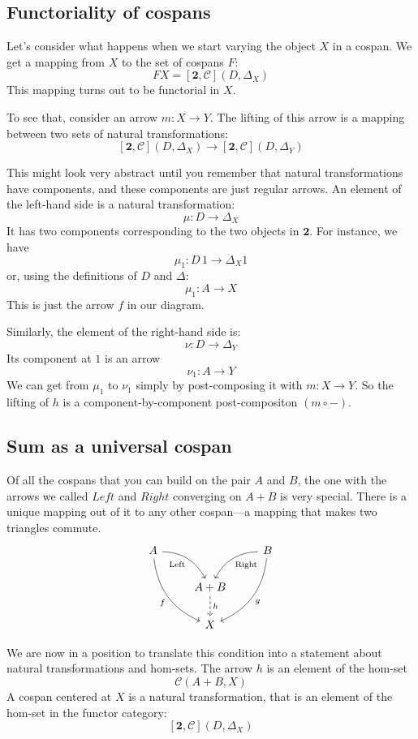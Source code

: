 \documentclass[DaoFP]{subfiles}
\begin{document}
\subsection{Functoriality of cospans}

Let's consider what happens when we start varying the object $X$ in a cospan. We get a mapping from $X$ to the set of cospans $F$:
\[ F X = [\mathbf{2}, \mathcal{C}](D, \Delta_X) \]
This mapping turns out to be functorial in $X$.

To see that, consider an arrow $m \colon X \to Y$. The lifting of this arrow is a mapping between two sets of natural transformations:
\[ [\mathbf{2}, \mathcal{C}](D, \Delta_X) \to [\mathbf{2}, \mathcal{C}](D, \Delta_{Y}) \] 
 
This might look very abstract until you remember that natural transformations have components, and these components are just regular arrows. An element of the left-hand side is a natural transformation:
\[ \mu \colon D \to \Delta_X \]
It has two components corresponding to the two objects in $\mathbf{2}$. For instance, we have
\[ \mu_1 \colon D \, 1 \to \Delta_X 1 \]
or, using the definitions of $D$ and $\Delta$:
\[ \mu_1 \colon A \to X \]
This is just the arrow $f$ in our diagram. 

Similarly, the element of the right-hand side is:
\[ \nu \colon D \to \Delta_{Y} \]
Its component at $1$ is an arrow
\[ \nu_1 \colon A \to Y \]
We can get from $\mu_1$ to $\nu_1$ simply by post-composing it with $m \colon X \to Y$. So the lifting of $h$ is a component-by-component post-compositon $(m \circ -)$. 

\subsection{Sum as a universal cospan}

Of all the cospans that you can build on the pair $A$ and $B$, the one with the arrows we called $Left$ and $Right$ converging on $A + B$  is very special. There is a unique mapping out of it to any other cospan---a mapping that makes two triangles commute.  
\[
 \begin{tikzcd}
 A
 \arrow[dr,  bend left, "\text{Left}"']
 \arrow[ddr, bend right, "f"']
 && B
 \arrow[dl, bend right, "\text{Right}"]
 \arrow[ddl, bend left, "g"]
 \\
&A + B
\arrow[d, dashed, "h"]
\\
& X
 \end{tikzcd}
\]

We are now in a position to translate this condition into a statement about natural transformations and hom-sets. The arrow $h$ is an element of the hom-set 
\[ \mathcal{C}(A + B, X)\]
A cospan centered at $X$ is a natural transformation, that is an element of the hom-set in the functor category:
\[ [\mathbf{2}, \mathcal{C}](D, \Delta_X) \]
\end{document}
